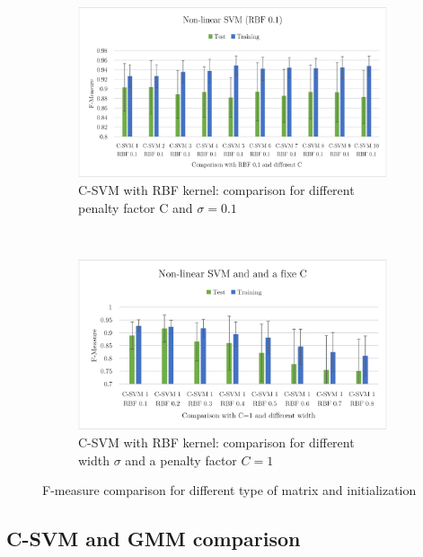 \documentclass[a4paper,10pt]{article}
\begin{document}
 \begin{figure}[H]
 \centering
    \begin{subfigure}[t]{0.4\textwidth}
      \centering
      \includegraphics[width=\textwidth]{pictures/non-linear-SVM_fixeRBF}
      \caption{C-SVM with RBF kernel: comparison for different penalty factor C  and $\sigma = 0.1$}
      \label{fig:non-linear-SVM_fixeRBF}
     \end{subfigure}
      ~
    \begin{subfigure}[t]{0.4\textwidth}
      \centering
      \includegraphics[width=\textwidth]{pictures/non-linear-SVM_fixeC}
      \caption{C-SVM with RBF kernel: comparison for different width $\sigma$ and a penalty factor $C = 1$}
      \label{fig:non-linear-SVM_fixeC}
     \end{subfigure}
     \caption{F-measure comparison for different type of matrix and initialization}
\end{figure}

\subsection{C-SVM and GMM comparison}
\end{document}

